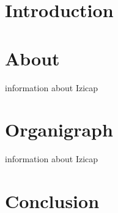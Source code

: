 
\section*{Introduction}

\section{About}
information about Izicap
\section{Organigraph}
information about Izicap

\section*{Conclusion}
